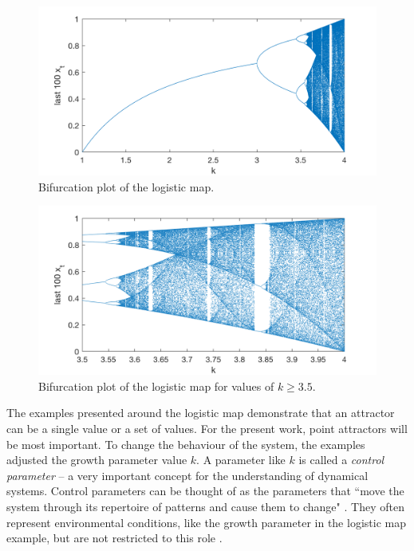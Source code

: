 \begin{figure}[htp]
\begin{center}
\includegraphics[width=\textwidth]{figures/ch3/logistic_map_bifurcation.png}
\caption{Bifurcation plot of the logistic map.}
\label{fig:logistic_map_bifurcation}
\end{center}
\end{figure}

\begin{figure}[htp]
\begin{center}
\includegraphics[width=\textwidth]{figures/ch3/logistic_map_bifurcation_zoom.png}
\caption{Bifurcation plot of the logistic map for values of $k \geq 3.5$.}
\label{fig:logistic_map_bifurcation_zoom}
\end{center}
\end{figure}

The examples presented around the logistic map demonstrate that an attractor can be a single value or a set of values. For the present work, point attractors will be most important. To change the behaviour of the system, the examples adjusted the growth parameter value $k$. A parameter like $k$ is called a \emph{control parameter} -- a very important concept for the understanding of dynamical systems. Control parameters can be thought of as the parameters that ``move the system through its repertoire of patterns and cause them to change" \citep[1538]{Kelso2013}. They often represent environmental conditions, like the growth parameter in the logistic map example, but are not restricted to this role \citep{Kelso2013}. 

